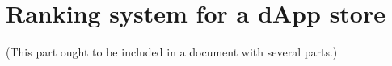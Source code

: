 


\date{\today} 



\tableofcontents \newpage

\part{Ranking system for a dApp store}
(This part ought to be included in a document with several parts.) %

 \newpage
  \newpage
  \newpage
 \newpage
 \newpage
 \newpage
  \newpage

